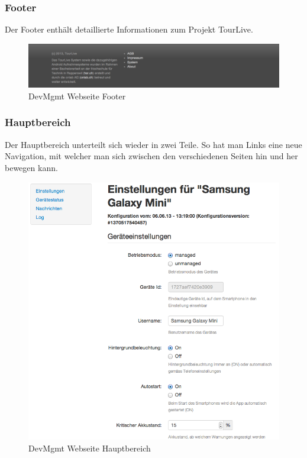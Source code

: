\subsubsection{Footer}
Der Footer enthält detaillierte Informationen zum Projekt TourLive. 
 
\begin{figure}[H]
	\centering
	\includegraphics[width=120mm]{images/devmgmtsrv/footer.png}
	\caption{DevMgmt Webseite Footer}
\end{figure}


\subsubsection{Hauptbereich}
Der Hauptbereich unterteilt sich wieder in zwei Teile. So hat man Links eine neue Navigation, mit welcher man sich zwischen den verschiedenen Seiten hin und her bewegen kann. 
 
\begin{figure}[H]
	\centering
	\includegraphics[width=120mm]{images/devmgmtsrv/settings.png}
	\caption{DevMgmt Webseite Hauptbereich}
\end{figure}
